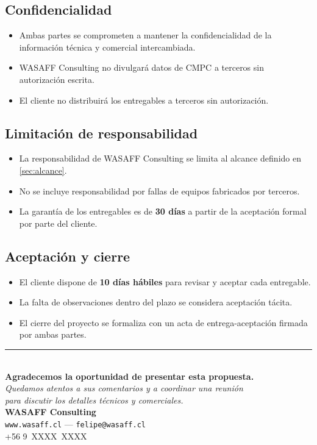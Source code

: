 \documentclass[11pt,a4paper]{article}
\begin{document}
\subsection{Confidencialidad}

\begin{itemize}
  \item Ambas partes se comprometen a mantener la confidencialidad de la información técnica y comercial intercambiada.
  \item WASAFF Consulting no divulgará datos de CMPC a terceros sin autorización escrita.
  \item El cliente no distribuirá los entregables a terceros sin autorización.
\end{itemize}

\subsection{Limitación de responsabilidad}

\begin{itemize}
  \item La responsabilidad de WASAFF Consulting se limita al alcance definido en \cref{sec:alcance}.
  \item No se incluye responsabilidad por fallas de equipos fabricados por terceros.
  \item La garantía de los entregables es de \textbf{30 días} a partir de la aceptación formal por parte del cliente.
\end{itemize}

\subsection{Aceptación y cierre}

\begin{itemize}
  \item El cliente dispone de \textbf{10 días hábiles} para revisar y aceptar cada entregable.
  \item La falta de observaciones dentro del plazo se considera aceptación tácita.
  \item El cierre del proyecto se formaliza con un acta de entrega-aceptación firmada por ambas partes.
\end{itemize}

\vspace{2cm}

\begin{center}
\rule{0.6\textwidth}{0.5pt}\\[0.5cm]
\textbf{Agradecemos la oportunidad de presentar esta propuesta.}\\[0.3cm]
\textit{Quedamos atentos a sus comentarios y a coordinar una reunión}\\
\textit{para discutir los detalles técnicos y comerciales.}\\[1cm]
\textbf{WASAFF Consulting}\\
\texttt{www.wasaff.cl} — \texttt{felipe@wasaff.cl}\\
+56 9 \,XXXX \,XXXX
\end{center}
\end{document}
